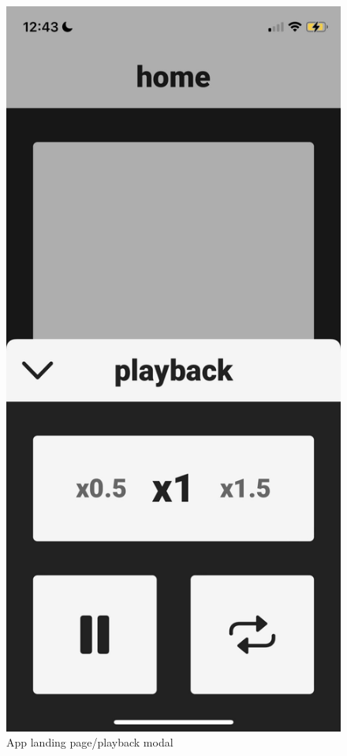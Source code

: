 \documentclass[a4paper,11pt]{article}
\begin{document}
\begin{figure}[H]
\includegraphics[scale=0.2]{img/app/playback.png}
\caption{App landing page/playback modal}
\label{fig:app_screenshots}
\end{figure}
\newpage
\end{document}
